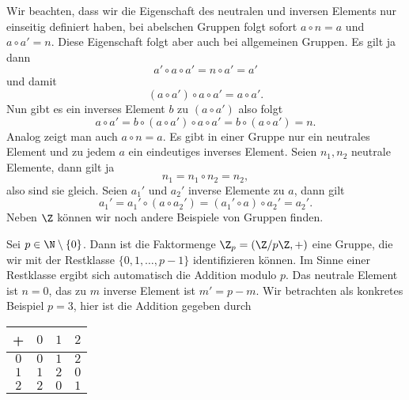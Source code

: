 \documentclass[letterpaper,10pt,english]{jupyterBook}
\begin{document}
Wir beachten, dass wir die Eigenschaft des neutralen und inversen Elements nur einseitig definiert haben, bei abelschen Gruppen folgt sofort \(a \circ n = a\) und \(a \circ a'=n\). Diese Eigenschaft folgt aber auch bei allgemeinen Gruppen. Es gilt ja dann
\begin{equation*}
a' \circ a  \circ a' = n \circ a' = a'
\end{equation*}
und damit
\begin{equation*}
(a \circ a') \circ a \circ a' = a \circ a' .
\end{equation*}
Nun gibt es ein inverses Element \(b\) zu \((a \circ a')\) also folgt
\begin{equation*}
a \circ a' = b \circ (a \circ a') \circ a \circ a' = b \circ (a \circ a') = n.
\end{equation*}
Analog zeigt man auch \(a \circ n = a\).
Es gibt in einer Gruppe nur ein neutrales Element und zu jedem \(a\) ein eindeutiges inverses Element. Seien \(n_1,n_2\) neutrale Elemente, dann gilt ja
\begin{equation*}
n_1 = n_1 \circ n_2 = n_2,
\end{equation*}
also sind sie gleich. Seien \(a_1'\) und \(a_2'\) inverse Elemente zu \(a\), dann gilt
\begin{equation*}
a_1' = a_1' \circ (a \circ a_2') = (a_1' \circ a) \circ a_2' = a_2'.
\end{equation*}
Neben \(\Z\) können wir noch andere Beispiele von Gruppen finden.
\label{grundlagen/zahlensysteme:example-5}
\begin{example}{}{}



Sei \(p \in \N \setminus \{0\}\). Dann ist die Faktormenge \(\Z_p = (\Z/p\Z, +)\) eine Gruppe, die wir mit der Restklasse
\( \{0,1,\ldots,p-1\}\) identifizieren können. Im Sinne einer Restklasse ergibt sich automatisch die Addition modulo \(p\). Das neutrale Element ist \(n=0\), das zu \(m\) inverse Element ist \(m'=p-m\). Wir betrachten als konkretes Beispiel \(p=3\), hier ist die Addition gegeben durch


\begin{center}
\centering
\begin{tabularx}{\linewidth}[{\linewidth}]{|c|c|c|c|}\hline
 
+
& 
\(0\)
& 
\(1\)
& 
\(2\)
\\
\hline
\(0\)
&
\(0\)
&
\(1\)
&
\(2\)
\\
\hline
\(1\)
&
\(1\)
&
\(2\)
&
\(0\)
\\
\hline
\(2\)
&
\(2\)
&
\(0\)
&
\(1\)
\\
\hline
\end{tabularx}
\end{center}
\end{example}
\end{document}
